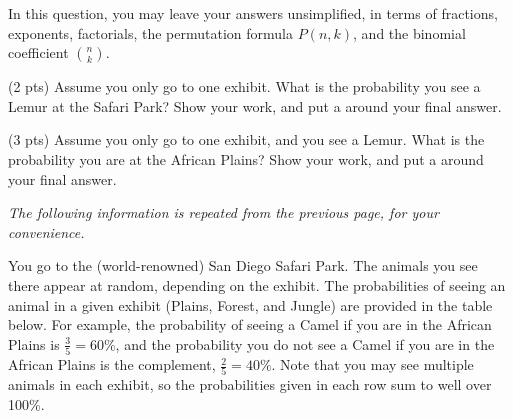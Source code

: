 \documentclass[twoside,12pt]{article}
\newcommand{\suraj}[1]{{\color{blue}[{\bf Suraj}: #1]}}
\begin{document}
\begin{probset}
\begin{prob}[(11 pts)]
In this question, you may leave your answers unsimplified, in terms of fractions, exponents, factorials, the permutation formula $P(n, k)$, and the binomial coefficient ${n \choose k}$.


\begin{subprobset}
    \begin{subprob}(2 pts)
        Assume you only go to one exhibit. What is the probability you see a Lemur at the Safari Park? Show your work, and put a  around your final answer.

        \begin{responsebox}{1in}
            
        \end{responsebox}
    \end{subprob}

    \begin{subprob}(3 pts)
        Assume you only go to one exhibit, and you see a Lemur. What is the probability you are at the African Plains? Show your work, and put a  around your final answer.

        \begin{responsebox}{1in}
            
        \end{responsebox}
    \end{subprob}    

\end{subprobset}

    \newpage 
\textit{The following information is repeated from the previous page, for your convenience.}

    You go to the (world-renowned) San Diego Safari Park. The animals you see there appear at random, depending on the exhibit. The probabilities of seeing an animal in a given exhibit (Plains, Forest, and Jungle) are provided in the table below. For example, the probability of seeing a Camel if you are in the African Plains is $\frac{3}{5} = 60\%$, and the probability you do not see a Camel if you are in the African Plains is the complement, $\frac{2}{5} = 40\%$. Note that you may see multiple animals in each exhibit, so the probabilities given in each row sum to well over 100\%.


\end{prob}
\end{probset}
\end{document}
